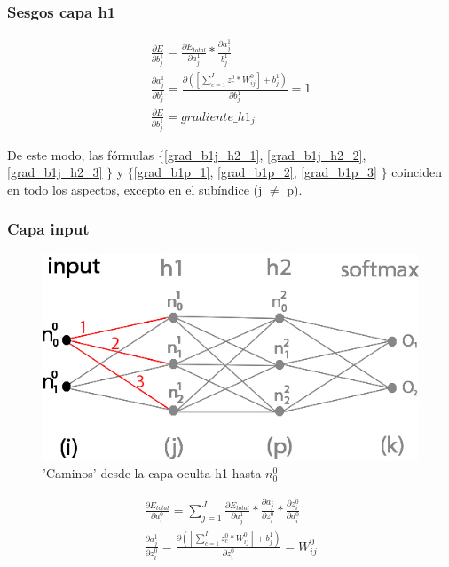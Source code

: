 \subsubsection{Sesgos capa h1}

\begin{gather}
	\frac{\partial E}{\partial b^1_j} = \frac{\partial E_{total} }{\partial a^1_j } * \frac{\partial a^1_j}{b^1_j} \label{grad_b1j_h2_1} \\
	\frac{\partial a^1_j }{\partial b^1_j } = \frac{\partial ([\sum_{c=1}^{I} z^0_c * W^0_{ij}] + b^1_j) }{\partial b^1_j } = 1 \label{grad_b1j_h2_2} \\
	\frac{\partial E}{\partial b^1_j} = gradiente\_h1_j
	\label{grad_b1j_h2_3}
\end{gather}

De este modo, las fórmulas $\{$\ref{grad_b1j_h2_1}, \ref{grad_b1j_h2_2}, \ref{grad_b1j_h2_3} $\}$ y $\{$\ref{grad_b1p_1}, \ref{grad_b1p_2}, \ref{grad_b1p_3} $\}$ coinciden en todo los aspectos, excepto en el subíndice (j $\neq$ p).

\subsubsection{Capa input}

\begin{figure}[H]
	\centering
	\includegraphics[scale=0.35]{imagenes/nn_2_capas_caminos_posibles_input.jpg}  
	\caption{'Caminos' desde la capa oculta h1 hasta $n^0_0$}
	\label{nn_2_capas_caminos_posibles_input}
\end{figure}

\begin{gather}
	\frac{\partial E_{total}}{\partial a^0_i} = \sum_{j=1}^J \frac{\partial E_{total}}{\partial a^1_j} * \frac{\partial a^1_j}{\partial z^0_i} * \frac{\partial z^0_i}{\partial a^0_i} \label{grad_a_h2_1} \\
	\frac{\partial a^1_j }{\partial z^0_i } = \frac{\partial ([\sum_{c=1}^{I} z^0_c * W^0_{ij}] + b^1_j) }{\partial z^0_i } = W^0_{ij} \label{grad_a_h2_2}
\end{gather}

